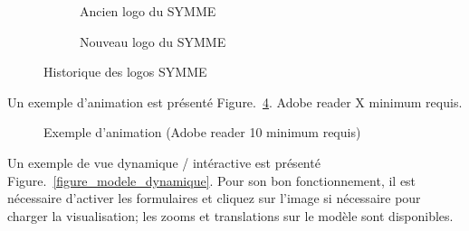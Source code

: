 \documentclass[a4paper,12pt]{report}
\begin{document}
\begin{figure}[hbtp]
	\centering
	\begin{subfigure}[b]{0.3\textwidth}
		\centering
		\def\svgwidth{\columnwidth}
		\fontsize{10pt}{10pt}\selectfont
		\caption{Ancien logo du SYMME} 
		\label{figure_ancien_logo_SYMME}
	\end{subfigure}
	\qquad
	\begin{subfigure}[b]{0.15\textwidth}
		\centering
		\def\svgwidth{\columnwidth}
		\fontsize{10pt}{10pt}\selectfont
		\caption{Nouveau logo du SYMME} 
		\label{figure_nouveau_logo_SYMME}
	\end{subfigure}
	\caption{Historique des logos SYMME} 
	\label{figure_deux_logo_SYMME}
\end{figure}


\newpage
\FloatBarrier
Un exemple d'animation est présenté Figure.~\ref{Fig_animation}. Adobe reader X minimum requis.

\begin{figure}[hbtp]
\begin{center}
\caption{Exemple d'animation (Adobe reader 10 minimum requis)} 
\label{Fig_animation} 
\end{center}  
\end{figure}


\newpage
\FloatBarrier
Un exemple de vue dynamique / intéractive est présenté Figure.~\ref{figure_modele_dynamique}. Pour son bon fonctionnement, il est nécessaire d'activer les formulaires et cliquez sur l'image si nécessaire pour charger la visualisation; les zooms et translations sur le modèle sont disponibles.

\end{document}
